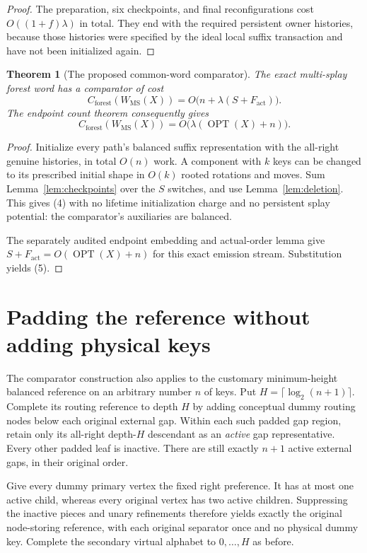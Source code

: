 \documentclass[11pt]{article}
\newtheorem{theorem}{Theorem}
\newcommand{\OPT}{\operatorname{OPT}}
\newcommand{\MS}{\mathrm{MS}}
\begin{document}
\begin{proof}
The preparation, six checkpoints, and final reconfigurations cost
$O((1+f)\lambda)$ in total. They end with the required persistent owner
histories, because those histories were specified by the ideal local
suffix transaction and have not been initialized again.
\end{proof}

\begin{theorem}[The proposed common-word comparator]\label{thm:comparator}
The exact multi-splay forest word has a comparator of cost
\[
 C_{\mathrm{forest}}(W_{\MS}(X))
   =O\bigl(n+\lambda(S+F_{\mathrm{act}})\bigr).
                                                        \tag{4}
\]
The endpoint count theorem consequently gives
\[
 C_{\mathrm{forest}}(W_{\MS}(X))
   =O\bigl(\lambda(\OPT(X)+n)\bigr).
                                                        \tag{5}
\]
\end{theorem}

\begin{proof}
Initialize every path's balanced suffix representation with the
all-right genuine histories, in total $O(n)$ work. A component with
$k$ keys can be changed to its prescribed initial shape in $O(k)$
rooted rotations and moves. Sum Lemma~\ref{lem:checkpoints} over the
$S$ switches, and use Lemma~\ref{lem:deletion}. This gives (4) with
no lifetime initialization charge and no persistent splay potential:
the comparator's auxiliaries are balanced.

The separately audited endpoint embedding and actual-order lemma give
$S+F_{\mathrm{act}}=O(\OPT(X)+n)$ for this exact emission stream.
Substitution yields (5).
\end{proof}

\section{Padding the reference without adding physical keys}

The comparator construction also applies to the customary minimum-height
balanced reference on an arbitrary number $n$ of keys. Put
$H=\lceil\log_2(n+1)\rceil$. Complete its routing reference to depth
$H$ by adding conceptual dummy routing nodes below each original
external gap. Within each such padded gap region, retain only its
all-right depth-$H$ descendant as an \emph{active} gap representative.
Every other padded leaf is inactive. There are still exactly $n+1$
active external gaps, in their original order.

Give every dummy primary vertex the fixed right preference. It has
at most one active child, whereas every original vertex has two active
children. Suppressing the inactive pieces and unary refinements
therefore yields exactly the original node-storing reference, with
each original separator once and no physical dummy key. Complete the
secondary virtual alphabet to $0,\ldots,H$ as before.
\end{document}
